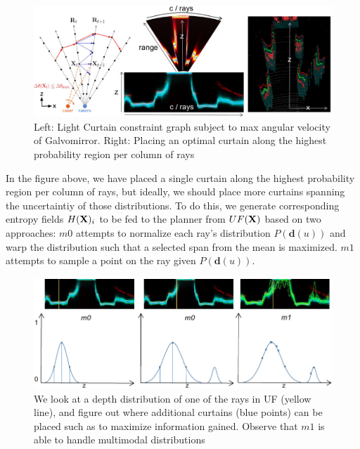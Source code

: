 \begin{figure}[h]
   \centering
   \begin{minipage}{0.5\textwidth}
       \centering
       \includegraphics[width=1.0\textwidth]{figures/planner.pdf}
   \end{minipage}\hfill
   \centering
   \caption{Left: Light Curtain constraint graph subject to max angular velocity of Galvomirror. Right: Placing an optimal curtain along the highest probability region per column of rays}
\end{figure}

In the figure above, we have placed a single curtain along the highest probability region per column of rays, but ideally, we should place more curtains spanning the uncertaintiy of those distributions. To do this, we generate corresponding entropy fields $H(\mathbf{X})_{i}$ to be fed to the planner from $UF(\mathbf{X})$ based on two approaches: $m0$ attempts to normalize each ray's distribution $P(\mathbf{d}(u))$ and warp the distribution such that a selected span from the mean is maximized. $m1$ attempts to sample a point on the ray given $P(\mathbf{d}(u))$. 

\begin{figure}[h]
   \centering
   \begin{minipage}{0.5\textwidth}
       \centering
       \includegraphics[width=1.0\textwidth]{figures/fields.pdf}
   \end{minipage}\hfill
   \centering
   \caption{We look at a depth distribution of one of the rays in UF (yellow line), and figure out where additional curtains (blue points) can be placed such as to maximize information gained. Observe that $m1$ is able to handle multimodal distributions}
   \label{fig:m0m1}
\end{figure}

